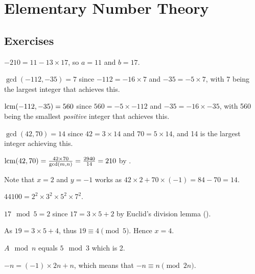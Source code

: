 \section{Elementary Number Theory}
\subsection*{Exercises}
\begin{questions}
    \item $-210 = 11 - 13 \times 17$, so $a = 11$ and $b = 17$.

    \item $\gcd(-112, -35) = 7$ since $-112 = -16 \times 7$ and $-35 = -5 \times 7$, with 7 being the largest integer that achieves this.

    \item $\mathrm{lcm}(-112, -35) = 560$ since $560 = -5 \times -112$ and $-35 = -16 \times -35$, with 560 being the smallest \textit{positive} integer that achieves this.

    \item \begin{partquestions}{\roman*}
        \item $\gcd(42, 70) = 14$ since $42 = 3 \times 14$ and $70 = 5 \times 14$, and 14 is the largest integer achieving this.

        \item $\mathrm{lcm}(42, 70) = \frac{42 \times 70}{\gcd(m, n)} = \frac{2940}{14} = 210$ by .

        \item Note that $x = 2$ and $y = -1$ works as $42 \times 2 + 70 \times (-1) = 84 - 70 = 14$.
    \end{partquestions}

    \item $44100 = 2^2 \times 3^2 \times 5^2 \times 7^2$.

    \item \begin{partquestions}{\alph*}
        \item $17 \mod 5 = 2$ since $17 = 3 \times 5 + 2$ by Euclid's division lemma ().
        \item As $19 = 3 \times 5 + 4$, thus $19 \equiv 4 \pmod 5$. Hence $x = 4$.
        \item $A \mod n$ equals $5 \mod 3$ which is 2.
    \end{partquestions}

    \item $-n = (-1) \times 2n + n$, which means that $-n \equiv n \pmod{2n}$.


\end{questions}
